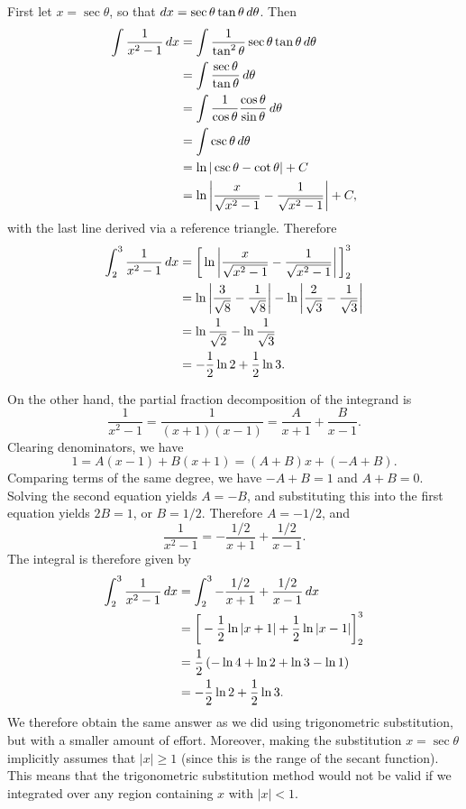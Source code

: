 \documentclass[handout]{ximera}
\begin{document}
\begin{freeResponse}
First let $x=\sec \theta$, so that $\mathop{}\!d x = \sec \theta \tan \theta \mathop{}\!d \theta$. Then
\begin{align*}
\int \frac{1}{x^2-1} \mathop{}\!d x &= \int \frac{1}{\tan^2 \theta} \sec \theta \tan \theta \mathop{}\!d \theta \\
&= \int \frac{\sec \theta}{\tan \theta} \mathop{}\!d \theta \\
&= \int \frac{1}{\cos \theta} \frac{\cos \theta}{\sin \theta} \mathop{}\!d \theta \\
&= \int \csc \theta \mathop{}\!d \theta \\
&= \ln |\csc \theta - \cot \theta| + C \\
&= \ln \left|\frac{x}{\sqrt{x^2-1}} - \frac{1}{\sqrt{x^2-1}}\right|+C,
\end{align*}
with the last line derived via a reference triangle. Therefore
\begin{align*}
\int_2^3 \frac{1}{x^2-1} \mathop{}\!d x &= \bigg[ \ln \left|\frac{x}{\sqrt{x^2-1}} - \frac{1}{\sqrt{x^2-1}}\right| \bigg]_2^3 \\
&= \ln \left|\frac{3}{\sqrt{8}} - \frac{1}{\sqrt{8}}\right| - \ln \left| \frac{2}{\sqrt{3}} - \frac{1}{\sqrt{3}}\right|\\
&= \ln \frac{1}{\sqrt{2}} - \ln \frac{1}{\sqrt{3}} \\
&= -\frac{1}{2} \ln 2 + \frac{1}{2} \ln 3.
\end{align*}

On the other hand, the partial fraction decomposition of the integrand is 
$$
\frac{1}{x^2-1} = \frac{1}{(x+1)(x-1)} = \frac{A}{x+1} + \frac{B}{x-1}.
$$
Clearing denominators, we have
$$
1 = A(x-1) + B(x+1) = (A+B)x + (-A+B).
$$
Comparing terms of the same degree, we have $-A+B=1$ and $A+B = 0$. Solving the second equation yields $A=-B$, and substituting this into the first equation yields $2B=1$, or $B=1/2$. Therefore $A=-1/2$, and 
$$
\frac{1}{x^2-1} = -\frac{1/2}{x+1} + \frac{1/2}{x-1}.
$$
The integral is therefore given by
\begin{align*}
\int_2^3 \frac{1}{x^2-1} \mathop{}\!d x &= \int_2^3  -\frac{1/2}{x+1} + \frac{1/2}{x-1} \mathop{}\!d x \\
&= \bigg[ -\frac{1}{2} \ln |x+1| + \frac{1}{2} \ln |x-1|  \bigg]_2^3 \\
&= \frac{1}{2}\left(- \ln 4 + \ln 2 + \ln 3 - \ln 1\right) \\
&=  -\frac{1}{2} \ln 2 + \frac{1}{2} \ln 3.
\end{align*}
We therefore obtain the same answer as we did using trigonometric substitution, but with a smaller amount of effort. Moreover, making the substitution $x=\sec \theta$ implicitly assumes that $|x| \geq 1$ (since this is the range of the secant function). This means that the trigonometric substitution method would not be valid if we integrated over any region containing $x$ with $|x| < 1$. 
\end{freeResponse}
\end{document}
